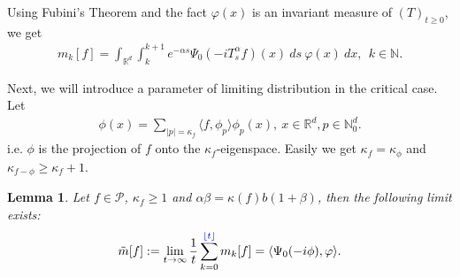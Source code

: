 \documentclass[12pt,oneside,english]{amsart}
\theoremstyle{plain}
\newtheorem{lem}[thm]{Lemma}
\theoremstyle{definition}
\numberwithin{equation}{section}
\newcommand{\added}[1]{{\color{blue}#1}}\newcommand{\deleted}[1]{{\color{red}#1}}
\begin{document}
Using Fubini's Theorem and the fact $\varphi(x)$ is an invariant measure of $(T)_{t\geq 0}$, we get
\begin{align}
    m_k[f]=\int_{\mathbb{R}^d}\int_k^{k+1} e^{-\alpha s}\Psi_0(-iT_{s}^{\alpha}f)(x)~ds~\varphi(x)~dx,~~k\in \mathbb{N}.\label{mkeq}
\end{align}

\deleted {Next, we will introduce a parameter of limiting distribution in the critical case.}
Let
\begin{align}
    \phi(x)=\sum_{|p|=\kappa_f}\langle f, \phi_p\rangle\phi_p(x),~x\in \mathbb{R}^d, p \in\mathbb{N}_0^d.
\end{align}
i.e. $\phi$ is the projection of $f$ onto the $\kappa_f$-eigenspace. Easily we get $\kappa_f=\kappa_{\phi}$ and $\kappa_{f-\phi}\geq \kappa_f+1$.
\begin{lem}\label{lemma210}
Let $f \in \mathcal{P}$, $\kappa_f\geq 1$ and $\alpha\beta=\kappa(f)b(1+\beta)$, then the following limit exists:
\begin{align}
    \tilde{m}[f]:=\lim_{t\rightarrow \infty}\frac{1}{t}\sum_{k=0}^{\added{\lfloor t \rfloor}}m_k[f]=\langle\Psi_0(-i\phi),\varphi\rangle.
\end{align}
\end{lem}
\end{document}
